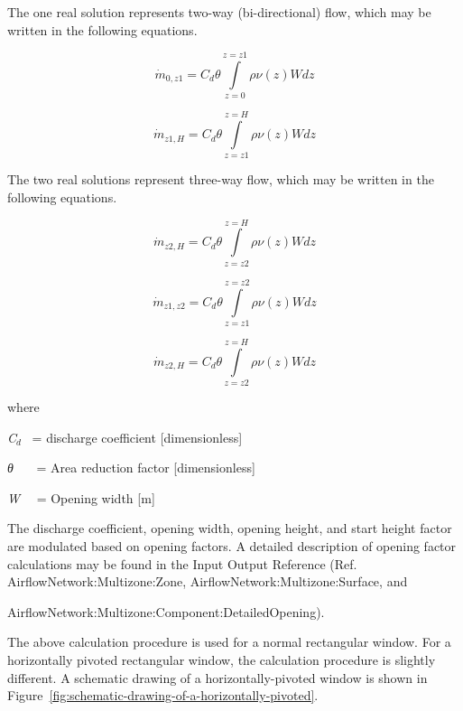 The one real solution represents two-way (bi-directional) flow, which may be written in the following equations.

\begin{equation}
{\dot m_{0,z1}} = {C_d}\theta \int\limits_{z = 0}^{z = z1} {\rho \nu (z)Wdz}
\end{equation}

\begin{equation}
{\dot m_{z1,H}} = {C_d}\theta \int\limits_{z = z1}^{z = H} {\rho \nu (z)Wdz}
\end{equation}

The two real solutions represent three-way flow, which may be written in the following equations.

\begin{equation}
{\dot m_{z2,H}} = {C_d}\theta \int\limits_{z = z2}^{z = H} {\rho \nu (z)Wdz}
\end{equation}

\begin{equation}
{\dot m_{z1,z2}} = {C_d}\theta \int\limits_{z = z1}^{z = z2} {\rho \nu (z)Wdz}
\end{equation}

\begin{equation}
{\dot m_{z2,H}} = {C_d}\theta \int\limits_{z = z2}^{z = H} {\rho \nu (z)Wdz}
\end{equation}

where

\emph{C\(_{d}\)}~ = discharge coefficient {[}dimensionless{]}

\emph{θ}~~~ = Area reduction factor {[}dimensionless{]}

\emph{W}~~ = Opening width {[}m{]}

The discharge coefficient, opening width, opening height, and start height factor are modulated based on opening factors. A detailed description of opening factor calculations may be found in the Input Output Reference (Ref. AirflowNetwork:Multizone:Zone, AirflowNetwork:Multizone:Surface, and

AirflowNetwork:Multizone:Component:DetailedOpening).

The above calculation procedure is used for a normal rectangular window. For a horizontally pivoted rectangular window, the calculation procedure is slightly different. A schematic drawing of a horizontally-pivoted window is shown in Figure~\ref{fig:schematic-drawing-of-a-horizontally-pivoted}.

